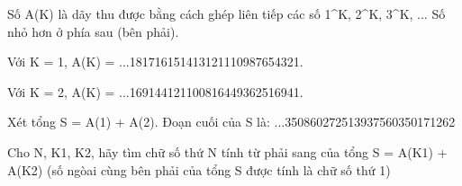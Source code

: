 Số A(K) là dãy thu được bằng cách ghép liên tiếp các số 1^K, 2^K, 3^K, ... Số nhỏ hơn ở phía sau (bên phải).

Với K = 1, A(K) = ...181716151413121110987654321.

Với K = 2, A(K) = ...169144121100816449362516941.

Xét tổng S = A(1) + A(2). Đoạn cuối của S là: ...350860272513937560350171262

Cho N, K1, K2, hãy tìm chữ số thứ N tính từ phải sang của tổng S = A(K1) + A(K2) (số ngòai cùng bên phải của tổng S được tính là chữ số thứ 1)